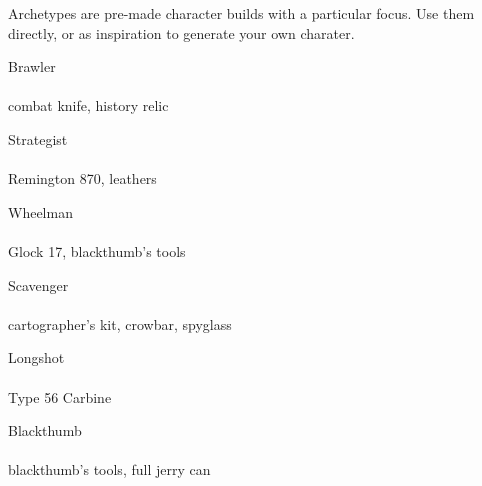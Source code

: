 
Archetypes are pre-made character builds with a particular focus. Use them directly, or as inspiration to generate your own charater.

\vspace*{-1em}

\begin{multicols}{2}
\begin{describe}{Brawler} \\
    \\
combat knife, history relic
\end{describe}

\begin{describe}{Strategist} \\
    \\
Remington 870, leathers
\end{describe}
\end{multicols}

\vspace*{-1.5em}

\begin{multicols}{2}
\begin{describe}{Wheelman} \\
    \\
Glock 17, blackthumb's tools
\end{describe}

\begin{describe}{Scavenger} \\
    \\
cartographer's kit, crowbar, spyglass
\end{describe}
\end{multicols}

\vspace*{-1.5em}

\begin{multicols}{2}
\begin{describe}{Longshot} \\
    \\
Type 56 Carbine
\end{describe}

\begin{describe}{Blackthumb} \\
    \\
blackthumb's tools, full jerry can
\end{describe}
\end{multicols}

\vspace*{-1.5em}
